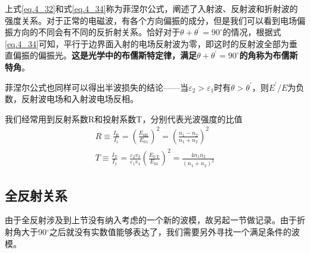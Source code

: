         \vspace*{2em}
        
        上式\ref{eq.4_32}和式\ref{eq.4_34}称为菲涅尔公式，阐述了入射波、反射波和折射波的强度关系。对于正常的电磁波，有各个方向偏振的成分，但是我们可以看到电场偏振方向的不同会有不同的反折射关系。恰好对于$\theta + \theta^{\prime}=90^\circ$的情况，根据式\ref{eq.4_34}可知，平行于边界面入射的电场反射波为零，即这时的反射波全部为垂直偏振的偏振光。\textbf{这是光学中的布儒斯特定律，满足$\theta + \theta^{\prime}=90^\circ$的角称为布儒斯特角}。

        菲涅尔公式也同样可以得出半波损失的结论——当$\varepsilon_2 > \varepsilon_1$时有$\theta > \theta^\prime$，则$E^\prime/E$为负数，反射波电场和入射波电场反相。

        我们经常用到反射系数R和投射系数T，分别代表光波强度的比值
        \begin{equation}
            \begin{gathered}
            R \equiv \frac{I_{\mathrm{R}}}{I_{1}}=\left(\frac{E_{0 \mathrm{R}}}{E_{01}}\right)^{2}=\left(\frac{n_{1}-n_{2}}{n_{1}+n_{2}}\right)^{2} \\
            T \equiv \frac{I_{\mathrm{T}}}{I_{1}}=\frac{\varepsilon_{2} v_{2}}{\varepsilon_{1} v_{1}}\left(\frac{E_{0 \mathrm{~T}}}{E_{01}}\right)^{2}=\frac{4 n_{1} n_{2}}{\left(n_{1}+n_{2}\right)^{2}}
            \end{gathered}
        \end{equation}

        \subsection{全反射关系}  
        由于全反射涉及到上节没有纳入考虑的一个新的波模，故另起一节做记录。由于折射角大于90$^\circ$之后就没有实数值能够表达了，我们需要另外寻找一个满足条件的波模。

